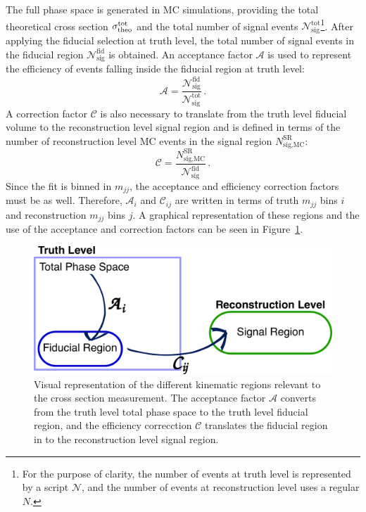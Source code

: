 The full phase space is generated in MC simulations, providing the total theoretical cross section $\sigma_{\textrm{theo}}^{\textrm{tot}}$
and the total number of signal events $\mathcal{N}_{\textrm{sig}}^{\textrm{tot}}$\footnote{For the purpose of clarity, the number of events at truth level is represented by a script $\mathcal{N}$, and the number of events at reconstruction level uses a regular $N$.}.
After applying the fiducial selection at truth level, the total number of signal events in the fiducial region $\mathcal{N}_{\textrm{sig}}^{\textrm{fid}}$ is obtained.
An acceptance factor $\mathcal{A}$ is used to represent the efficiency of events falling inside the fiducial region at truth level:
\begin{equation}
  \mathcal{A} = \frac{\mathcal{N}_{\textrm{sig}}^{\textrm{fid}}}{\mathcal{N}_{\textrm{sig}}^{\textrm{tot}}}\,.
  \label{eq:ssww13tev_xsec_acceptance}
\end{equation}
A correction factor $\mathcal{C}$ is also necessary to translate from the truth level fiducial volume to the reconstruction level signal region and is defined in terms of the number of reconstruction level MC events in the signal region $N_{\textrm{sig,MC}}^{\textrm{SR}}$:
\begin{equation}
  \mathcal{C} = \frac{N_{\textrm{sig,MC}}^{\textrm{SR}}}{\mathcal{N}_{\textrm{sig}}^{\textrm{fid}}}\,.
  \label{eq:ssww13tev_xsec_efficiency}
\end{equation}
Since the fit is binned in $m_{jj}$, the acceptance and efficiency correction factors must be as well.
Therefore, $\mathcal{A}_i$ and $\mathcal{C}_{ij}$ are written in terms of truth $m_{jj}$ bins $i$ and reconstruction $m_{jj}$ bins $j$.
A graphical representation of these regions and the use of the acceptance and correction factors can be seen in Figure~\ref{fig:ssww13tev_xsec_fiducial_graphic}.

\begin{figure}[htbp]
  \centering
  \includegraphics[width=.8\textwidth]{figs/ssww_13tev/xsec/fiducial}
  \caption{Visual representation of the different kinematic regions relevant to the cross section measurement.  The acceptance factor $\mathcal{A}$ converts from the truth level total phase space to the truth level fiducial region, and the efficiency correcction $\mathcal{C}$ translates the fiducial region in to the reconstruction level signal region.}
  \label{fig:ssww13tev_xsec_fiducial_graphic}
\end{figure}

